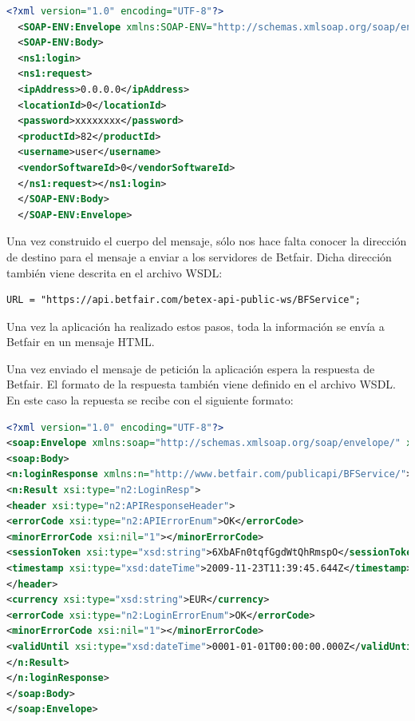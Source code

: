 \begin{lstlisting}[language=xml]
  <?xml version="1.0" encoding="UTF-8"?>
  <SOAP-ENV:Envelope xmlns:SOAP-ENV="http://schemas.xmlsoap.org/soap/envelope/" xmlns:SOAP-ENC="http://schemas.xmlsoap.org/soap/encoding/" xmlns:xsi="http://www.w3.org/2001/XMLSchema-instance" xmlns:xsd="http://www.w3.org/2001/XMLSchema" xmlns:ns2="http://www.betfair.com/publicapi/types/global/v3/" xmlns:ns1="http://www.betfair.com/publicapi/v3/BFGlobalService/">
  <SOAP-ENV:Body>
  <ns1:login>
  <ns1:request>
  <ipAddress>0.0.0.0</ipAddress>
  <locationId>0</locationId>
  <password>xxxxxxxx</password>
  <productId>82</productId>
  <username>user</username>
  <vendorSoftwareId>0</vendorSoftwareId>
  </ns1:request></ns1:login>
  </SOAP-ENV:Body>
  </SOAP-ENV:Envelope> 
 \end{lstlisting}
 
  Una vez construido el cuerpo del mensaje, sólo nos hace falta conocer la dirección de destino para el mensaje a enviar a los servidores de Betfair. Dicha dirección también viene descrita en el archivo WSDL:
  
\begin{lstlisting}
URL = "https://api.betfair.com/betex-api-public-ws/BFService";
\end{lstlisting}

  Una vez la aplicación ha realizado estos pasos, toda la información se envía a Betfair en un mensaje HTML. 
  
  Una vez enviado el mensaje de petición la aplicación espera la respuesta de Betfair. El formato de la respuesta también viene definido en el archivo WSDL. En este caso la repuesta se recibe con el siguiente formato:

\begin{lstlisting}[language=xml] 
<?xml version="1.0" encoding="UTF-8"?>
<soap:Envelope xmlns:soap="http://schemas.xmlsoap.org/soap/envelope/" xmlns:xsi="http://www.w3.org/2001/XMLSchema-instance" xmlns:n2="http://www.betfair.com/publicapi/types/" xmlns:xsd="http://www.w3.org/2001/XMLSchema">
<soap:Body>
<n:loginResponse xmlns:n="http://www.betfair.com/publicapi/BFService/">
<n:Result xsi:type="n2:LoginResp">
<header xsi:type="n2:APIResponseHeader">
<errorCode xsi:type="n2:APIErrorEnum">OK</errorCode>
<minorErrorCode xsi:nil="1"></minorErrorCode>
<sessionToken xsi:type="xsd:string">6XbAFn0tqfGgdWtQhRmspO</sessionToken>
<timestamp xsi:type="xsd:dateTime">2009-11-23T11:39:45.644Z</timestamp>
</header>
<currency xsi:type="xsd:string">EUR</currency>
<errorCode xsi:type="n2:LoginErrorEnum">OK</errorCode>
<minorErrorCode xsi:nil="1"></minorErrorCode>
<validUntil xsi:type="xsd:dateTime">0001-01-01T00:00:00.000Z</validUntil>
</n:Result>
</n:loginResponse>
</soap:Body>
</soap:Envelope>
 \end{lstlisting}
 
